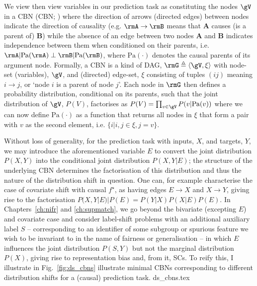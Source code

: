 We view then view variables in our prediction task as constituting the nodes \( \gV \) in a
\acl{CBN} (\acs{CBN}; \citealp{pearl1995bayesian}) where the direction of arrows (directed edges)
between nodes indicate the direction of causality (e.g. \(\rmA \to \rmB \) means that \textbf{A}
causes (is a parent of) \textbf{B}) while the absence of an edge between two nodes \textbf{A} and
\textbf{B} indicates independence between them when conditioned on their parents, i.e. \( \rmA |
\text{Pa}(\rmA) \perp \rmB | \text{Pa}(\rmB) \), where \( \text{Pa}(\cdot) \) denotes the causal
parents of its argument node.
%
Formally, a \ac{CBN} is a kind of \ac{DAG}, \(\rmG \triangleq \langle \gV, \xi
\rangle \) with node-set (variables), \(\gV\), and (directed) edge-set, \(\xi\) consisting of
tuples \((ij)\) meaning \(i \to j \), or `node \(i\) is a parent of node \(j\)'.
%
Each node in \( \rmG \) then defines a probability distribution, conditional on its parents, such
that the joint distribution of \(\gV\), \( P(V) \), factorises as \( P(V) = \prod_{v \in \gV} P(v |
\text{Pa}(v)) \) where we can now define \(\text{Pa}(\cdot)\) as a function that returns all nodes
in \(\xi\) that form a pair with \(v\) as the second element, i.e. \( \{ i | i,j \in \xi, j = v \}
\).
%

Without loss of generality, for the prediction task with inputs, \(X\), and targets, \(Y\), we may
introduce the aforementioned variable \(E\) to convert the joint distribution \(P(X, Y)\) into the
conditional joint distribution \( P(X, Y | E ) \); the structure of the underlying \ac{CBN} determines
the factorisation of this distribution and thus the nature of the distribution shift in question.
%
One can, for example characterise the case of covariate shift with causal \(f^\star\), as having
edges  \(E \to X\) and \( X \to Y \), giving rise to the factorisation \( P(X, Y | E) | P(E) =
P(Y|X)P(X|E)P(E) \). 
%
In Chapters~\ref{ch:nifr} and \ref{ch:supmatch}, we go beyond the bivariate (excepting \( E \)) and
covariate case and consider label-shift problems with an additional auxiliary label \(S\) --
corresponding to an identifier of some subgroup or spurious feature we wish to be invariant to in
the name of fairness or generalisation --  in which \(E\) influences the joint distribution \( P(S,
Y) \) but not the marginal distribution \(P(X)\), giving rise to representation bias and, from it,
\acp{SC}.
%
To reify this, I illustrate in Fig.~\ref{fig:ds_cbns} illustrate minimal \acp{CBN} corresponding to
different distribution shifts for a (causal) prediction task.
%
{ds_cbns.tex}
%
%

